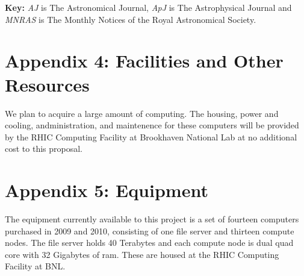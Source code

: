 \documentclass[12pt]{article}
\begin{document}
\newpage
{}
\renewcommand{\refname}{\section*{Appendix 3: Bibliography for Narrative}\label{app:bib}}


\vspace{5mm}
\noindent
{\bf Key:} {\it AJ} is The Astronomical Journal, {\it ApJ} is The 
Astrophysical Journal and {\it MNRAS} is The Monthly Notices of the Royal
Astronomical Society.






\newpage
{}
\section*{Appendix 4: Facilities and Other Resources}

We plan to acquire a large amount of computing.  The housing, power and
cooling, andministration, and maintenence for these computers will be provided
by the RHIC Computing Facility at Brookhaven National Lab at no additional cost
to this proposal.		

\newpage
{}
\section*{Appendix 5: Equipment}

The equipment currently available to this project is a set of fourteen
computers purchased in 2009 and 2010, consisting of one file server and
thirteen compute nodes.  The file server holds 40 Terabytes and each compute
node is dual quad core with 32 Gigabytes of ram.  These are housed at the RHIC
Computing Facility at BNL.
\end{document}

